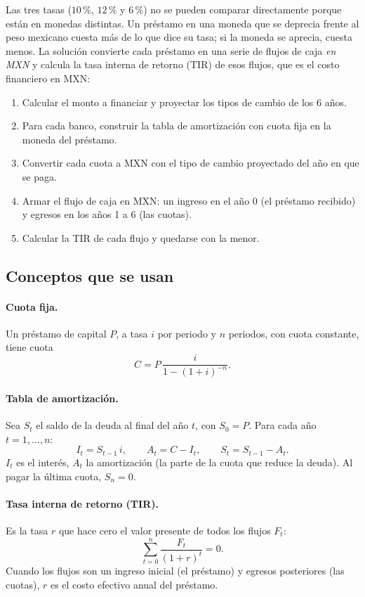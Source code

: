 \documentclass[11pt]{article}
\newcommand{\pc}{\text{\%}}
\begin{document}
Las tres tasas ($10\,\pc$, $12\,\pc$ y $6\,\pc$) no se pueden comparar directamente porque est\'an en monedas distintas. Un pr\'estamo en una moneda que se deprecia frente al peso mexicano cuesta m\'as de lo que dice su tasa; si la moneda se aprecia, cuesta menos. La soluci\'on convierte cada pr\'estamo en una serie de flujos de caja \emph{en MXN} y calcula la tasa interna de retorno (TIR) de esos flujos, que es el costo financiero en MXN:

\begin{enumerate}
\item Calcular el monto a financiar y proyectar los tipos de cambio de los 6 a\~nos.
\item Para cada banco, construir la tabla de amortizaci\'on con cuota fija en la moneda del pr\'estamo.
\item Convertir cada cuota a MXN con el tipo de cambio proyectado del a\~no en que se paga.
\item Armar el flujo de caja en MXN: un ingreso en el a\~no 0 (el pr\'estamo recibido) y egresos en los a\~nos 1 a 6 (las cuotas).
\item Calcular la TIR de cada flujo y quedarse con la menor.
\end{enumerate}

\subsection{Conceptos que se usan}

\paragraph{Cuota fija.} Un pr\'estamo de capital $P$, a tasa $i$ por periodo y $n$ periodos, con cuota constante, tiene cuota
\[
C=P\,\frac{i}{1-(1+i)^{-n}}.
\]

\paragraph{Tabla de amortizaci\'on.} Sea $S_t$ el saldo de la deuda al final del a\~no $t$, con $S_0=P$. Para cada a\~no $t=1,\dots,n$:
\[
I_t=S_{t-1}\,i,\qquad A_t=C-I_t,\qquad S_t=S_{t-1}-A_t .
\]
$I_t$ es el inter\'es, $A_t$ la amortizaci\'on (la parte de la cuota que reduce la deuda). Al pagar la \'ultima cuota, $S_n=0$.

\paragraph{Tasa interna de retorno (TIR).} Es la tasa $r$ que hace cero el valor presente de todos los flujos $F_t$:
\[
\sum_{t=0}^{n}\frac{F_t}{(1+r)^t}=0 .
\]
Cuando los flujos son un ingreso inicial (el pr\'estamo) y egresos posteriores (las cuotas), $r$ es el costo efectivo anual del pr\'estamo.
\end{document}
